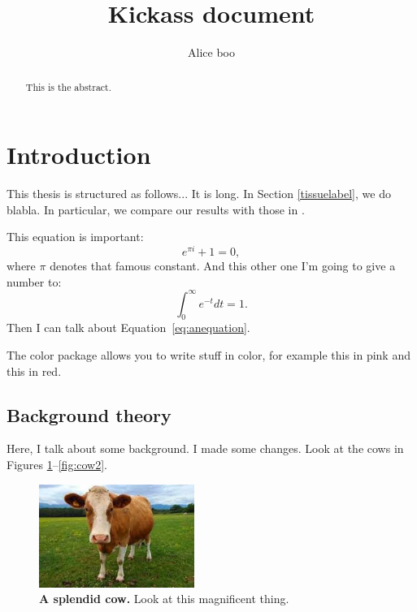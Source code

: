 \documentclass[a4paper,11pt,leqno]{article}
\numberwithin{equation}{section}
\begin{document}

\title{Kickass document}
\author{Alice boo}

\maketitle


\begin{abstract}
This is the abstract.
\end{abstract}


\tableofcontents

\newpage

\section{Introduction}

This thesis is structured as follows... It is long. In Section \ref{tissuelabel}, we do blabla. In particular, we compare our results with those in \cite{RN33}.

This equation is important:
%
$$e^{\pi i}+1=0,$$
%
where $\pi$ denotes that famous constant. And this other one I'm going to give a number to:
%
\begin{equation}\label{eq:anequation}
\int_0^\infty e^{-t}dt = 1.
\end{equation}
%
Then I can talk about Equation~\eqref{eq:anequation}. 

The color package allows you to write stuff in color, for example {\color{magenta} this in pink} and {\color{red} this in red}.

\subsection{Background theory}



Here, I talk about some background. I made some changes. Look at the cows in Figures \ref{fig:cow1}--\ref{fig:cow2}.

\begin{figure}[h]
	\begin{center}
	\includegraphics[width=0.45\textwidth]{./cowinside}
	\vspace{-20pt}
	\end{center}
\caption{\textbf{A splendid cow.} Look at this magnificent thing.}
\label{fig:cow1}
\end{figure}
\end{document}
